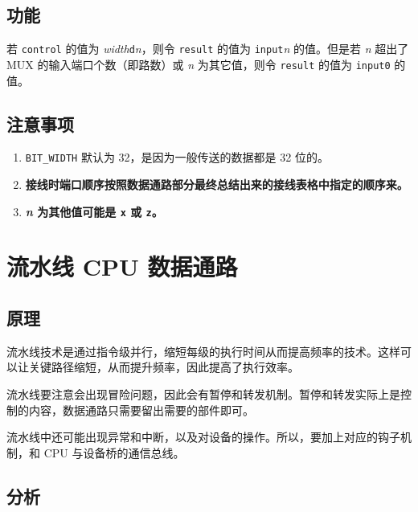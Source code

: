 \documentclass[12pt,AutoFakeBold,AutoFakeSlant]{article}
\providecommand{\tightlist}{%
  \setlength{\itemsep}{0pt}\setlength{\parskip}{0pt}}
\begin{document}
\hypertarget{ux529fux80fd-15}{%
\subsection{功能}\label{ux529fux80fd-15}}

若 \texttt{control} 的值为
\emph{width}\texttt{\textquotesingle{}d}\emph{n}，则令 \texttt{result}
的值为 \texttt{input}\emph{n} 的值。但是若 \emph{n} 超出了 MUX
的输入端口个数（即路数）或 \emph{n} 为其它值，则令 \texttt{result}
的值为 \texttt{input0} 的值。

\hypertarget{ux6ce8ux610fux4e8bux9879-10}{%
\subsection{注意事项}\label{ux6ce8ux610fux4e8bux9879-10}}

\begin{enumerate}
\def\labelenumi{\arabic{enumi}.}
\tightlist
\item
  \texttt{BIT\_WIDTH} 默认为 32，是因为一般传送的数据都是 32 位的。
\item
  \textbf{接线时端口顺序按照数据通路部分最终总结出来的接线表格中指定的顺序来。}
\item
  \textbf{\emph{n} 为其他值可能是 \texttt{x} 或 \texttt{z}。}
\end{enumerate}

\hypertarget{ux6d41ux6c34ux7ebf-cpu-ux6570ux636eux901aux8def}{%
\section{流水线 CPU
数据通路}\label{ux6d41ux6c34ux7ebf-cpu-ux6570ux636eux901aux8def}}

\hypertarget{ux539fux7406-12}{%
\subsection{原理}\label{ux539fux7406-12}}

流水线技术是通过指令级并行，缩短每级的执行时间从而提高频率的技术。这样可以让关键路径缩短，从而提升频率，因此提高了执行效率。

流水线要注意会出现冒险问题，因此会有暂停和转发机制。暂停和转发实际上是控制的内容，数据通路只需要留出需要的部件即可。

流水线中还可能出现异常和中断，以及对设备的操作。所以，要加上对应的钩子机制，和 CPU 与设备桥的通信总线。

\hypertarget{ux5206ux6790}{%
\subsection{分析}\label{ux5206ux6790}}
\end{document}
